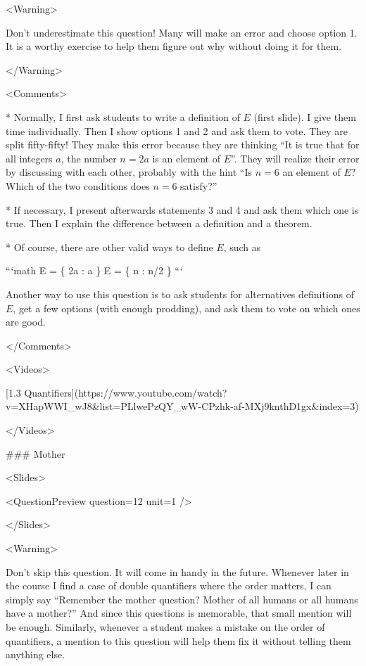<Warning>

Don’t underestimate this question! Many will make an error and choose option 1. It is a worthy exercise to help them figure out why without doing it for them.

</Warning>

<Comments>

*   Normally, I first ask students to write a definition of $E$ (first slide). I give them time individually. Then I show options 1 and 2 and ask them to vote. They are split fifty-fifty! They make this error because they are thinking “It is true that for all integers $a$, the number $n=2a$ is an element of $E$”. They will realize their error by discussing with each other, probably with the hint “Is $n=6$ an element of $E$? Which of the two conditions does $n=6$ satisfy?”

*   If necessary, I present afterwards statements 3 and 4 and ask them which one is true. Then I explain the difference between a definition and a theorem.

*   Of course, there are other valid ways to define $E$, such as

    ```math
    E = \{ 2a \; : \; a \in {}\} \quad \quad {}\quad \quad E = \{ n \in {}\; : \; n/2 \in {}\}
    ```

    Another way to use this question is to ask students for alternatives definitions of $E$, get a few options (with enough prodding), and ask them to vote on which ones are good.

</Comments>

<Videos>

[1.3 Quantifiers](https://www.youtube.com/watch?v=XHapWWI_wJ8\&list=PLlwePzQY_wW-CPzhk-af-MXj9knthD1gx\&index=3)

</Videos>

### Mother

<Slides>

<QuestionPreview question={12} unit={1} />

</Slides>

<Warning>

Don’t skip this question. It will come in handy in the future. Whenever later in the course I find a case of double quantifiers where the order matters, I can simply say “Remember the mother question? Mother of all humans or all humans have a mother?” And since this questions is memorable, that small mention will be enough. Similarly, whenever a student makes a mistake on the order of quantifiers, a mention to this question will help them fix it without telling them anything else.

